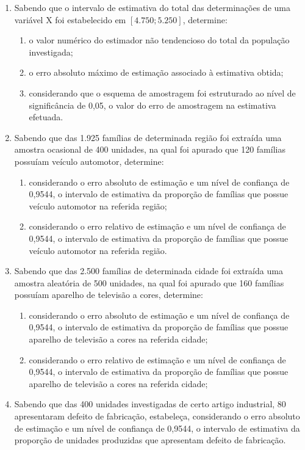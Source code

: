 \begin{enumerate}[resume]
\item Sabendo que o intervalo de estimativa do total das determinações de uma variável X foi estabelecido em $[4.750 ; 5.250]$, determine:
	\begin{enumerate}
	\item o valor numérico do estimador não tendencioso do total da população investigada;
	\item o erro absoluto máximo de estimação associado à estimativa obtida;
	\item considerando que o esquema de amostragem foi estruturado ao nível de significância de 0,05, o valor do erro de amostragem na estimativa efetuada.
	\end{enumerate}
	
\item Sabendo que das 1.925 famílias de determinada região foi extraída uma amostra ocasional de 400 unidades, na qual foi apurado que 120 famílias possuíam veículo automotor, determine:
	\begin{enumerate}
	\item considerando o erro absoluto de estimação e um nível de confiança de 0,9544, o intervalo de estimativa da proporção de famílias que possue veículo automotor na referida região;
	\item considerando o erro relativo de estimação e um nível de confiança de 0,9544, o intervalo de estimativa da proporção de famílias que possue veículo automotor na referida região.
	\end{enumerate}		

\item Sabendo que das 2.500 famílias de determinada cidade foi extraída uma amostra aleatória de 500 unidades, na qual foi apurado que 160 famílias possuíam aparelho de televisão a cores, determine:
	\begin{enumerate}
	\item considerando o erro absoluto de estimação e um nível de confiança de 0,9544, o intervalo de estimativa da proporção de famílias que possue aparelho de televisão a cores na referida cidade;
	\item considerando o erro relativo de estimação e um nível de confiança de 0,9544, o intervalo de estimativa da proporção de famílias que possue aparelho de televisão a cores na referida cidade;
	\end{enumerate}

\item Sabendo que das 400 unidades investigadas de certo artigo industrial, 80 apresentaram defeito de fabricação, estabeleça, considerando o erro absoluto de estimação e um nível de confiança de 0,9544, o intervalo de estimativa da proporção de
unidades produzidas que apresentam defeito de fabricação.


\end{enumerate}
